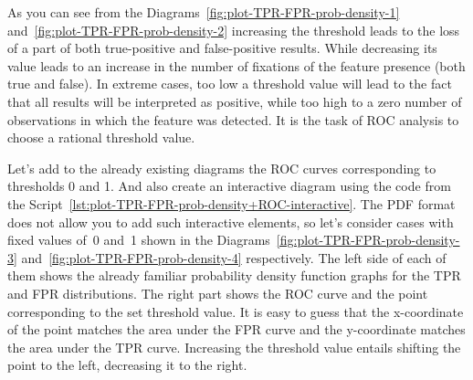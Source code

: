 \documentclass[]{scrreprt}
\begin{document}
As you can see from the Diagrams~\ref{fig:plot-TPR-FPR-prob-density-1} and~\ref{fig:plot-TPR-FPR-prob-density-2} increasing the threshold leads to the loss of a part of both true-positive and false-positive results. While decreasing its value leads to an increase in the number of fixations of the feature presence (both true and false). In extreme cases, too low a threshold value will lead to the fact that all results will be interpreted as positive, while too high to a zero number of observations in which the feature was detected. It is the task of ROC analysis to choose a rational threshold value.

Let's add to the already existing diagrams the ROC curves corresponding to thresholds 0 and 1. And also create an interactive diagram using the code from the Script~\ref{lst:plot-TPR-FPR-prob-density+ROC-interactive}. The PDF format does not allow you to add such interactive elements, so let's consider cases with fixed values of~0 and~1 shown in the Diagrams~\ref{fig:plot-TPR-FPR-prob-density-3} and~\ref{fig:plot-TPR-FPR-prob-density-4} respectively. The left side of each of them shows the already familiar probability density function graphs for the TPR and FPR distributions. The right part shows the ROC curve and the point corresponding to the set threshold value. It is easy to guess that the x-coordinate of the point matches the area under the FPR curve and the y-coordinate matches the area under the TPR curve. Increasing the threshold value entails shifting the point to the left, decreasing it to the right.
\end{document}
